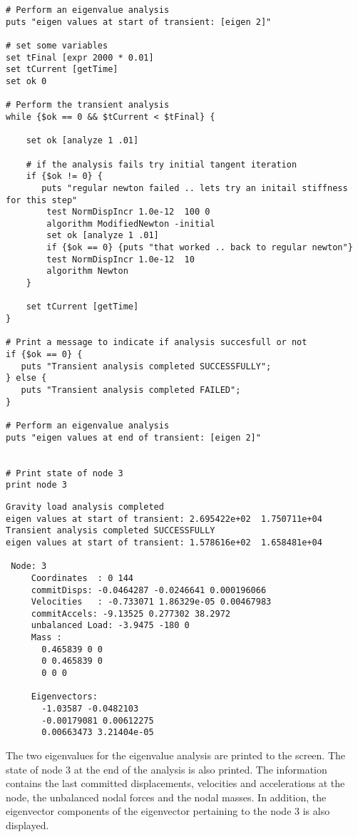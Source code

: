 \documentclass[12pt]{article}
\begin{document}
{\begin{verbatim}
# Perform an eigenvalue analysis
puts "eigen values at start of transient: [eigen 2]"

# set some variables
set tFinal [expr 2000 * 0.01]
set tCurrent [getTime]
set ok 0

# Perform the transient analysis
while {$ok == 0 && $tCurrent < $tFinal} {
    
    set ok [analyze 1 .01]
    
    # if the analysis fails try initial tangent iteration
    if {$ok != 0} {
       puts "regular newton failed .. lets try an initail stiffness for this step"
        test NormDispIncr 1.0e-12  100 0
        algorithm ModifiedNewton -initial
        set ok [analyze 1 .01]
        if {$ok == 0} {puts "that worked .. back to regular newton"}
        test NormDispIncr 1.0e-12  10 
        algorithm Newton
    }
    
    set tCurrent [getTime]
}

# Print a message to indicate if analysis succesfull or not
if {$ok == 0} {
   puts "Transient analysis completed SUCCESSFULLY";
} else {
   puts "Transient analysis completed FAILED";    
}

# Perform an eigenvalue analysis
puts "eigen values at end of transient: [eigen 2]"


# Print state of node 3
print node 3
\end{verbatim}
}


{\sf\small
\begin{verbatim}
Gravity load analysis completed
eigen values at start of transient: 2.695422e+02  1.750711e+04  
Transient analysis completed SUCCESSFULLY
eigen values at start of transient: 1.578616e+02  1.658481e+04  

 Node: 3
     Coordinates  : 0 144 
     commitDisps: -0.0464287 -0.0246641 0.000196066 
     Velocities   : -0.733071 1.86329e-05 0.00467983 
     commitAccels: -9.13525 0.277302 38.2972 
     unbalanced Load: -3.9475 -180 0 
     Mass : 
       0.465839 0 0 
       0 0.465839 0 
       0 0 0 

     Eigenvectors: 
       -1.03587 -0.0482103 
       -0.00179081 0.00612275 
       0.00663473 3.21404e-05 

\end{verbatim}
}

The two eigenvalues for the eigenvalue analysis are printed to the
screen. The state of node 3 at the end of the analysis is also
printed. 
The information contains the last committed displacements,
velocities and accelerations at the node, the unbalanced nodal forces
and the nodal masses. In addition, the eigenvector components of the
eigenvector pertaining to the node 3 is also displayed.
\end{document}
